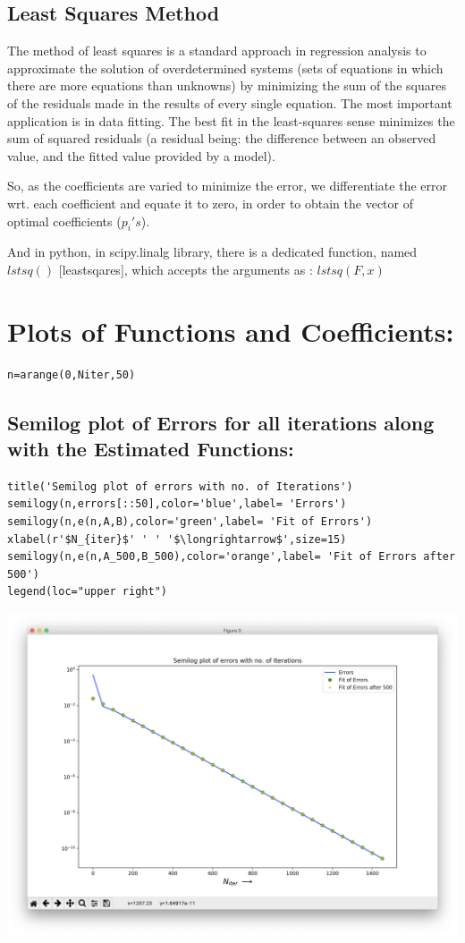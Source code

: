 \documentclass[10pt,english, openany]{book}
\begin{document}
\subsection{Least Squares Method}
The method of least squares is a standard approach in regression analysis to approximate the solution of overdetermined systems (sets of equations in which there are more equations than unknowns) by minimizing the sum of the squares of the residuals made in the results of every single equation.
The most important application is in data fitting. The best fit in the least-squares sense minimizes the sum of squared residuals (a residual being: the difference between an observed value, and the fitted value provided by a model).\par
So, as the coefficients are varied to minimize the error, we differentiate the error wrt. each coefficient and equate it to zero, in order to obtain the vector of optimal coefficients ($p_i 's$).\par
And in python, in scipy.linalg library, there is a dedicated function, named $lstsq()$ [leastsqares], which accepts the arguments as : $lstsq(F,x)$

\newpage
\section{Plots of Functions and Coefficients:}
\begin{verbatim}
n=arange(0,Niter,50)
\end{verbatim}
\subsection{Semilog plot of Errors for all iterations along with the Estimated Functions:}
\begin{verbatim}
title('Semilog plot of errors with no. of Iterations')
semilogy(n,errors[::50],color='blue',label= 'Errors')
semilogy(n,e(n,A,B),color='green',label= 'Fit of Errors') 
xlabel(r'$N_{iter}$' ' ' '$\longrightarrow$',size=15)
semilogy(n,e(n,A_500,B_500),color='orange',label= 'Fit of Errors after 500')
legend(loc="upper right")
\end{verbatim}
{\centering\includegraphics[scale=0.4]{Figure_0.png}}
\newpage
\end{document}
